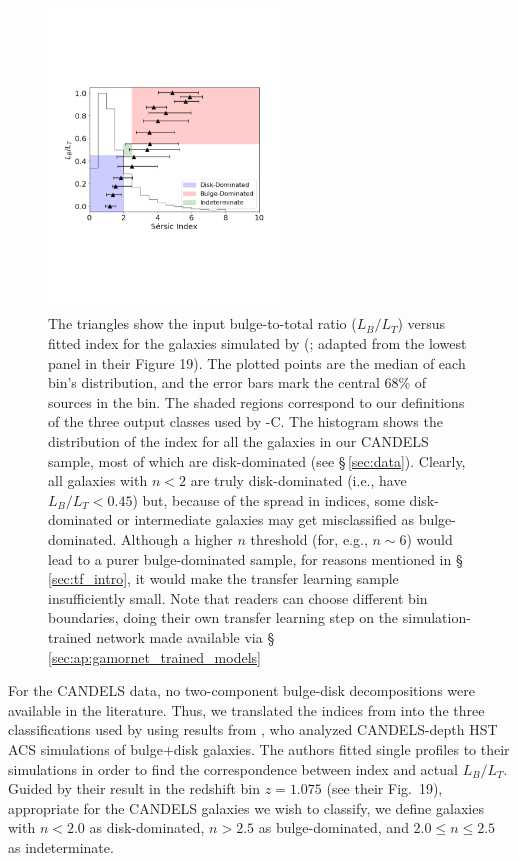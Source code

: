 \begin{figure}[hbt]
    \centering
    \includegraphics[width=0.55\textwidth]{btr_si.pdf}
    \caption{ The triangles show the input bulge-to-total ratio ($L_B/L_T$) versus fitted \sersic{} index for the galaxies simulated by \citeauthor{simmons_08} (\citeyear{simmons_08}; adapted from the lowest panel in their Figure 19). The plotted points are the median of each bin's distribution, and the error bars mark the central 68\% of sources in the bin. The shaded regions correspond to our definitions of the three output classes used by \gamornet{}-C. The histogram shows the distribution of the \sersic{} index for all the galaxies in our CANDELS sample, most of which are disk-dominated (see \S\,\ref{sec:data}). Clearly, all galaxies with $n<2$ are truly disk-dominated (i.e., have $L_B/L_T < 0.45$) but, because of the spread in \sersic{} indices, some disk-dominated or intermediate galaxies may get misclassified as bulge-dominated. Although a higher $n$ threshold (for, e.g., $n \sim 6$) would lead to a purer bulge-dominated sample, for reasons mentioned in \S\,\ref{sec:tf_intro}, it would make the transfer learning sample insufficiently small. Note that readers can choose different bin boundaries, doing their own transfer learning step on the simulation-trained network made available via \S\,\ref{sec:ap:gamornet_trained_models}}
    \label{fig:si_lb_lt}
\end{figure}{}
    
For the CANDELS data, no two-component bulge-disk decompositions were available in the literature. Thus, we translated the \sersic{} indices from \citet{vdw_12} into the three classifications used by \gamornet{} using results from \citet{simmons_08}, who analyzed CANDELS-depth HST ACS simulations of bulge+disk galaxies. The authors fitted single \sersic{} profiles to their simulations in order to find the correspondence between \sersic{} index and actual $L_B/L_T$. Guided by their result in the redshift bin $z=1.075$ (see their Fig.~19), appropriate for the CANDELS galaxies we wish to classify, we define galaxies with $n < 2.0$ as disk-dominated, $n > 2.5$ as bulge-dominated, and $ 2.0 \leq n \leq 2.5$ as indeterminate.
    
